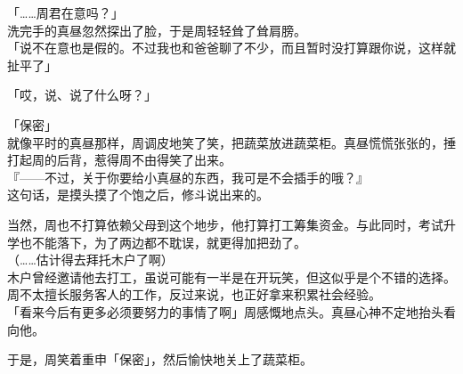 「……周君在意吗？」\\

洗完手的真昼忽然探出了脸，于是周轻轻耸了耸肩膀。\\

「说不在意也是假的。不过我也和爸爸聊了不少，而且暂时没打算跟你说，这样就扯平了」

「哎，说、说了什么呀？」

「保密」\\

就像平时的真昼那样，周调皮地笑了笑，把蔬菜放进蔬菜柜。真昼慌慌张张的，捶打起周的后背，惹得周不由得笑了出来。\\

『——不过，关于你要给小真昼的东西，我可是不会插手的哦？』\\

这句话，是摸头摸了个饱之后，修斗说出来的。

当然，周也不打算依赖父母到这个地步，他打算打工筹集资金。与此同时，考试升学也不能落下，为了两边都不耽误，就更得加把劲了。\\

（……估计得去拜托木户了啊）\\

木户曾经邀请他去打工，虽说可能有一半是在开玩笑，但这似乎是个不错的选择。周不太擅长服务客人的工作，反过来说，也正好拿来积累社会经验。\\

「看来今后有更多必须要努力的事情了啊」周感慨地点头。真昼心神不定地抬头看向他。

于是，周笑着重申「保密」，然后愉快地关上了蔬菜柜。

